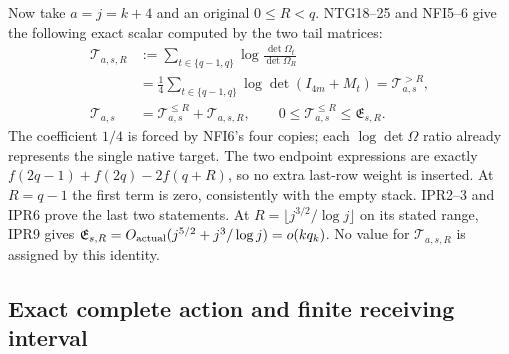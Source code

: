 \documentclass[11pt,a4paper]{article}
\begin{document}
Now take $a=j=k+4$ and an original $0\le R<q$.  NTG18--25 and
NFI5--6 give the following exact scalar computed by the two tail matrices:
\[
 \begin{split}
 \mathscr T_{a,s,R}
 &:=\sum_{t\in\{q-1,q\}}
              \log\frac{\det\Omega_t}{\det\Omega_R}\\
 &=\frac14\sum_{t\in\{q-1,q\}}\log\det(I_{4m}+M_t)
   =\mathcal T_{a,s}^{>R},\\
 \mathcal T_{a,s}&=\mathcal T_{a,s}^{\le R}+\mathscr T_{a,s,R},
 \qquad 0\le\mathcal T_{a,s}^{\le R}\le\mathfrak E_{s,R}.
 \end{split}
 \tag{TAC12}
\]
The coefficient $1/4$ is forced by NFI6's four copies; each
$\log\det\Omega$ ratio already represents the single native target.
The two endpoint expressions are exactly
$f(2q-1)+f(2q)-2f(q+R)$, so no extra last-row weight is inserted.
At $R=q-1$ the first term is zero, consistently with the empty stack.
IPR2--3 and IPR6 prove the last two statements.  At
$R=\lfloor j^{3/2}/\log j\rfloor$ on its stated range, IPR9 gives
$\mathfrak E_{s,R}=O_{\rm actual}(j^{5/2}+j^3/\log j)=o(kq_k)$.
No value for $\mathscr T_{a,s,R}$ is assigned by this identity.

\subsection{Exact complete action and finite receiving interval}
\end{document}
